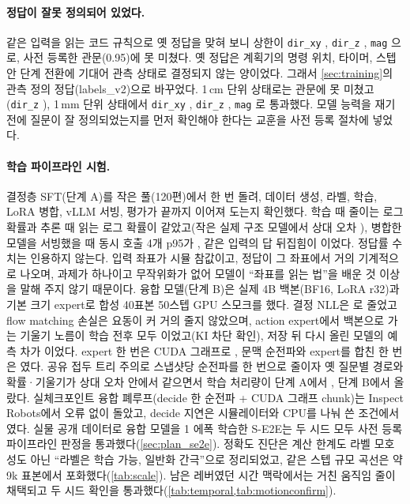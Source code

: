 \paragraph{정답이 잘못 정의되어 있었다.}
같은 입력을 읽는 코드 규칙으로 옛 정답을 맞혀 보니 상한이 \texttt{dir\_xy} , \texttt{dir\_z} , \texttt{mag} 으로, 사전 등록한 관문(0.95)에 못 미쳤다. 옛 정답은 계획기의 명령 위치, 타이머, 스텝 안 단계 전환에 기대어 관측 상태로 결정되지 않는 양이었다. 그래서 \cref{sec:training}의 관측 정의 정답(labels\_v2)으로 바꾸었다. 1\,cm 단위 상태로는 관문에 못 미쳤고(\texttt{dir\_z} ), 1\,mm 단위 상태에서 \texttt{dir\_xy} , \texttt{dir\_z} , \texttt{mag} 로 통과했다. 모델 능력을 재기 전에 질문이 잘 정의되었는지를 먼저 확인해야 한다는 교훈을 사전 등록 절차에 넣었다.

\paragraph{학습 파이프라인 시험.}
결정층 SFT(단계 A)를 작은 풀(120편)에서 한 번 돌려, 데이터 생성, 라벨, 학습, LoRA 병합, vLLM 서빙, 평가가 끝까지 이어져 도는지 확인했다. 학습 때 줄이는 로그 확률과 추론 때 읽는 로그 확률이 같았고(작은 실제 구조 모델에서 상대 오차 ), 병합한 모델을 서빙했을 때 동시 호출 4개 p95가 , 같은 입력의 답 뒤집힘이 이었다. 정답률 수치는 인용하지 않는다. 입력 좌표가 시뮬 참값이고, 정답이 그 좌표에서 거의 기계적으로 나오며, 과제가 하나이고 무작위화가 없어 모델이 ``좌표를 읽는 법''을 배운 것 이상을 말해 주지 않기 때문이다. 융합 모델(단계 B)은 실제 4B 백본(BF16, LoRA r32)과 기본 크기 expert로 합성 40표본 50스텝 GPU 스모크를 했다. 결정 NLL은 로 줄었고 flow matching 손실은 요동이 커 거의 줄지 않았으며, action expert에서 백본으로 가는 기울기 노름이 학습 전후 모두 이었고(KI 차단 확인), 저장 뒤 다시 올린 모델의 예측 차가 이었다. expert 한 번은 CUDA 그래프로 , 문맥 순전파와 expert를 합친 한 번은 였다. 공유 접두 트리 주의로 스냅샷당 순전파를 한 번으로 줄이자 옛 질문별 경로와 확률·기울기가 상대 오차  안에서 같으면서 학습 처리량이 단계 A에서 , 단계 B에서  올랐다. 실체크포인트 융합 폐루프(decide 한 순전파 + CUDA 그래프 chunk)는 Inspect Robots에서 오류 없이 돌았고, decide 지연은 시뮬레이터와 CPU를 나눠 쓴 조건에서 였다. 실물 공개 데이터로 융합 모델을 1 에폭 학습한 S-E2E는 두 시드 모두 사전 등록 파이프라인 판정을 통과했다(\cref{sec:plan_se2e}). 정확도 진단은 계산 한계도 라벨 모호성도 아닌 ``라벨은 학습 가능, 일반화 간극''으로 정리되었고, 같은 스텝 규모 곡선은 약 9k 표본에서 포화했다(\cref{tab:scale}). 남은 레버였던 시간 맥락에서는 거친 움직임 줄이 채택되고 두 시드 확인을 통과했다(\cref{tab:temporal,tab:motionconfirm}).

